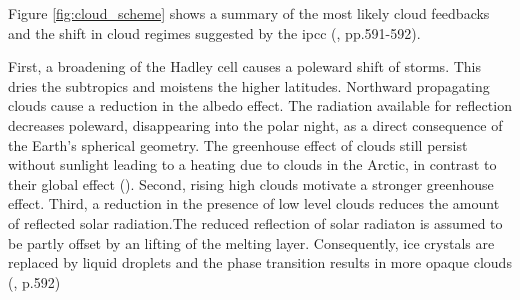 Figure \ref{fig:cloud_scheme} shows a summary of the most likely cloud feedbacks and the shift in cloud regimes suggested by the \acrshort{ipcc} (\cite{IPCC_CH7_clouds}, pp.591-592).

First, a broadening of the Hadley cell causes a poleward shift of storms. This dries the subtropics and moistens the higher latitudes. Northward propagating clouds cause a reduction in the albedo effect. The radiation available for reflection decreases poleward, disappearing into the polar night, as a direct consequence of the Earth's spherical geometry. 
The greenhouse effect of clouds still persist without sunlight leading to a heating due to clouds in the Arctic, in contrast to their global effect (\cite{WangArticCRE}). 
Second, rising high clouds motivate a stronger greenhouse effect. Third, a reduction in the presence of low level clouds reduces the amount of reflected solar radiation.The reduced reflection of solar radiaton is assumed to be partly offset by an lifting of the melting layer. Consequently, ice crystals are replaced by liquid droplets and the phase transition results in more opaque clouds (\cite{IPCC_CH7_clouds}, p.592) 
